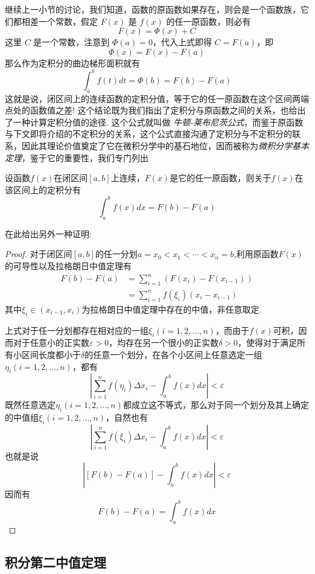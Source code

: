 继续上一小节的讨论，我们知道，函数的原函数如果存在，则会是一个函数族，它们都相差一个常数，假定 $F(x)$ 是 $f(x)$ 的任一原函数，则必有
\[ F(x) = \Phi(x) +C \]
这里 $C$ 是一个常数，注意到 $\Phi(a)=0$，代入上式即得 $C=F(a)$，即
\[ \Phi(x) = F(x) - F(a) \]
那么作为定积分的曲边梯形面积就有
\[ \int_a^{b}f(t)dt = \Phi(b) = F(b) - F(a) \]
这就是说，闭区间上的连续函数的定积分值，等于它的任一原函数在这个区间两端点处的函数值之差! 这个结论既为我们指出了定积分与原函数之间的关系，也给出了一种计算定积分值的途径. 这个公式就叫做 \emph{牛顿-莱布尼茨公式}，而鉴于原函数与下文即将介绍的不定积分的关系，这个公式直接沟通了定积分与不定积分的联系，因此其理论价值奠定了它在微积分学中的基石地位，因而被称为\emph{微积分学基本定理}，鉴于它的重要性，我们专门列出
\begin{theorem}
  设函数$f(x)$在闭区间$[a,b]$上连续，$F(x)$是它的任一原函数，则关于$f(x)$在该区间上的定积分有
  \[ \int_a^{b} f(x)dx=F(b)-F(a) \]
\end{theorem}
在此给出另外一种证明:
\begin{proof}
  对于闭区间$[a,b]$的任一分划$a=x_0<x_1<\cdots<x_n=b$,利用原函数$F(x)$的可导性以及拉格朗日中值定理有
  \begin{equation*}
    \begin{split}
      F(b)-F(a) & = \sum_{i=1}^n (F(x_i)-F(x_{i-1})) \\
      & = \sum_{i=1}^n f(\xi_i)(x_i-x_{i-1})
    \end{split}
  \end{equation*}
  其中$\xi_{i} \in (x_{i-1}, x_i)$为拉格朗日中值定理中存在的中值，非任意取定.

  上式对于任一分划都存在相对应的一组$\xi_i(i=1,2,\ldots,n)$，而由于$f(x)$可积，因而对于任意小的正实数$\varepsilon>0$，均存在另一个很小的正实数$\delta>0$，使得对于满足所有小区间长度都小于$\delta$的任意一个划分，在各个小区间上任意选定一组$\eta_i(i=1,2,\ldots,n)$，都有
  \[ \left|\sum_{i=1}^nf(\eta_i)\Delta x_i-\int_a^{b}f(x)dx \right| <\varepsilon \]
既然任意选定$\eta_i(i=1,2,\ldots,n)$都成立这不等式，那么对于同一个划分及其上确定的中值组$\xi_i(i=1,2,\ldots,n)$，自然也有
  \[ \left|\sum_{i=1}^nf(\xi_i)\Delta x_i-\int_a^{b}f(x)dx \right| <\varepsilon \]
  也就是说
  \[ \left| [F(b)-F(a)]-\int_a^{b}f(x)dx \right| <\varepsilon \]
  因而有
  \[ F(b)-F(a) = \int_a^{b} f(x)dx \]
\end{proof}

\subsection{积分第二中值定理}
\label{sec:second-midvalue-theorem-for-integral}

